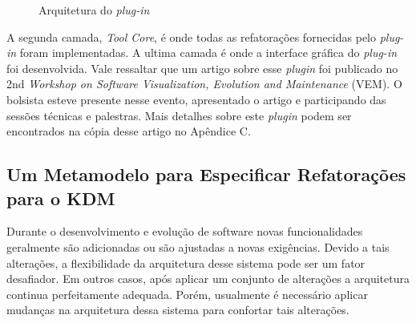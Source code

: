 \begin{figure}[!h]
 \centering
\caption{Arquitetura do \textit{plug-in}}
 \label{fig:architecture}
\end{figure}

A segunda camada, \textit{Tool Core}, é onde todas as refatorações fornecidas pelo \textit{plug-in} foram implementadas. A ultima camada é onde a interface gráfica do \textit{plug-in} foi desenvolvida. Vale ressaltar que um artigo sobre esse \textit{plugin} foi publicado no  2nd \textit{Workshop on Software Visualization, Evolution and Maintenance} (VEM). O bolsista esteve presente nesse evento, apresentado o artigo e participando das sessões técnicas e palestras. Mais detalhes sobre este \textit{plugin} podem ser encontrados na cópia desse artigo no Apêndice C.

\subsection{Um Metamodelo para Especificar Refatorações para o KDM}

Durante o desenvolvimento e evolução de software novas funcionalidades geralmente são adicionadas ou são ajustadas a novas exigências. Devido a tais alterações, a flexibilidade da arquitetura desse sistema pode ser um fator desafiador. Em outros casos, após aplicar um conjunto de alterações a arquitetura continua perfeitamente adequada. Porém, usualmente é necessário aplicar mudanças na arquitetura dessa sistema para confortar tais alterações. 

